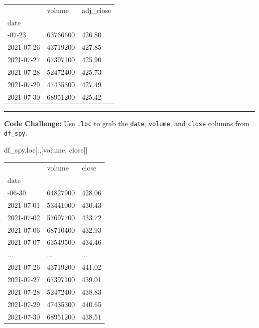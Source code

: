 \documentclass[
  letterpaper,
  DIV=11,
  numbers=noendperiod]{scrreprt}
\newenvironment{Shaded}{\begin{snugshade}}{\end{snugshade}}
\newcommand{\NormalTok}[1]{\textcolor[rgb]{0.00,0.23,0.31}{#1}}
\newcommand{\StringTok}[1]{\textcolor[rgb]{0.13,0.47,0.30}{#1}}
\begin{document}
\begin{longtable}[]{@{}lll@{}}
\toprule\noalign{}
& volume & adj\_close \\
date & & \\
\midrule\noalign{}
\endhead
\bottomrule\noalign{}
\endlastfoot
2021-07-23 & 63766600 & 426.80 \\
2021-07-26 & 43719200 & 427.85 \\
2021-07-27 & 67397100 & 425.90 \\
2021-07-28 & 52472400 & 425.73 \\
2021-07-29 & 47435300 & 427.49 \\
2021-07-30 & 68951200 & 425.42 \\
\end{longtable}

\begin{center}\rule{0.5\linewidth}{0.5pt}\end{center}

\textbf{Code Challenge:} Use \texttt{.loc} to grab the \texttt{date},
\texttt{volume}, and \texttt{close} columns from \texttt{df\_spy}.

\begin{Shaded}
\begin{Highlighting}[]
\NormalTok{df\_spy.loc[:,[}\StringTok{\textquotesingle{}volume\textquotesingle{}}\NormalTok{, }\StringTok{\textquotesingle{}close\textquotesingle{}}\NormalTok{]]}
\end{Highlighting}
\end{Shaded}

\begin{longtable}[]{@{}lll@{}}
\toprule\noalign{}
& volume & close \\
date & & \\
\midrule\noalign{}
\endhead
\bottomrule\noalign{}
\endlastfoot
2021-06-30 & 64827900 & 428.06 \\
2021-07-01 & 53441000 & 430.43 \\
2021-07-02 & 57697700 & 433.72 \\
2021-07-06 & 68710400 & 432.93 \\
2021-07-07 & 63549500 & 434.46 \\
... & ... & ... \\
2021-07-26 & 43719200 & 441.02 \\
2021-07-27 & 67397100 & 439.01 \\
2021-07-28 & 52472400 & 438.83 \\
2021-07-29 & 47435300 & 440.65 \\
2021-07-30 & 68951200 & 438.51 \\
\end{longtable}
\end{document}
